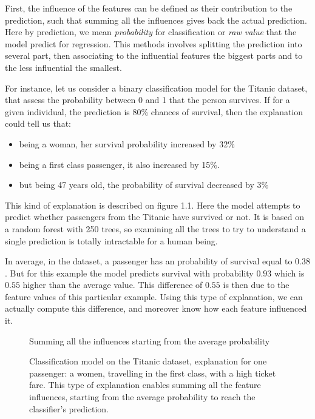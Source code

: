 \documentclass[a4paper,11pt]{kth-mag}
\begin{document}
First, the influence of the features can be defined as their contribution to the prediction, such that summing all the influences gives back the actual prediction. Here by prediction, we mean \textit{probability} for classification or \textit{raw value} that the model predict for regression. This methods involves splitting the prediction into several part, then associating to the influential features the biggest parts and to the less influential the smallest.

For instance, let us consider a binary classification model for the Titanic dataset, that assess the probability between 0 and 1 that the person survives.
If for a given individual, the prediction is 80\% chances of survival, then the explanation could tell us that:

\begin{itemize}
\item being a woman, her survival probability increased by 32\%
\item being a first class passenger, it also increased by 15\%.
\item but being 47 years old, the probability of survival decreased by 3\%
\end{itemize}

This kind of explanation is described on figure 1.1. Here the model attempts to predict whether passengers from the Titanic have survived or not. It is based on a random forest with 250 trees, so examining all the trees to try to understand a single prediction is totally intractable for a human being.

In average, in the dataset, a passenger has an probability of survival equal to $0.38$. But for this example the model predicts survival with probability $0.93$ which is $0.55$ higher than the average value. This difference of $0.55$ is then due to the feature values of this particular example. Using this type of explanation, we can actually compute this difference, and moreover know how each feature influenced it. 

\begin{figure}[h!]
		\centering
    	\def\svgwidth{\columnwidth}
    	
    	\caption{Summing all the influences starting from the average probability}
    \caption{Classification model on the Titanic dataset, explanation for one passenger: a women, travelling in the first class, with a high ticket fare. This type of explanation enables summing all the feature influences, starting from the average probability to reach the classifier's prediction.}
\end{figure}
\end{document}
